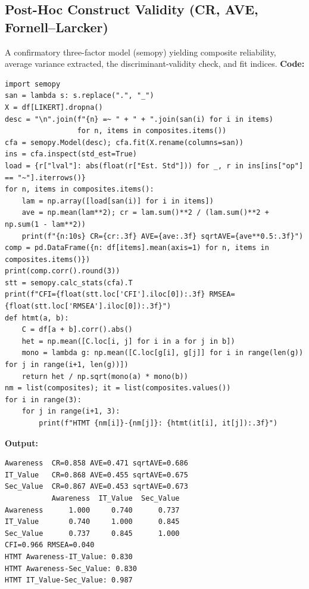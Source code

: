 \subsection{Post-Hoc Construct Validity (CR, AVE, Fornell--Larcker)}
A confirmatory three-factor model (semopy) yielding composite reliability, average variance extracted, the discriminant-validity check, and fit indices.
\noindent\textbf{Code:}\nopagebreak
{\tiny\begin{verbatim}
import semopy
san = lambda s: s.replace(".", "_")
X = df[LIKERT].dropna()
desc = "\n".join(f"{n} =~ " + " + ".join(san(i) for i in items)
                 for n, items in composites.items())
cfa = semopy.Model(desc); cfa.fit(X.rename(columns=san))
ins = cfa.inspect(std_est=True)
load = {r["lval"]: abs(float(r["Est. Std"])) for _, r in ins[ins["op"] == "~"].iterrows()}
for n, items in composites.items():
    lam = np.array([load[san(i)] for i in items])
    ave = np.mean(lam**2); cr = lam.sum()**2 / (lam.sum()**2 + np.sum(1 - lam**2))
    print(f"{n:10s} CR={cr:.3f} AVE={ave:.3f} sqrtAVE={ave**0.5:.3f}")
comp = pd.DataFrame({n: df[items].mean(axis=1) for n, items in composites.items()})
print(comp.corr().round(3))
stt = semopy.calc_stats(cfa).T
print(f"CFI={float(stt.loc['CFI'].iloc[0]):.3f} RMSEA={float(stt.loc['RMSEA'].iloc[0]):.3f}")
def htmt(a, b):
    C = df[a + b].corr().abs()
    het = np.mean([C.loc[i, j] for i in a for j in b])
    mono = lambda g: np.mean([C.loc[g[i], g[j]] for i in range(len(g)) for j in range(i+1, len(g))])
    return het / np.sqrt(mono(a) * mono(b))
nm = list(composites); it = list(composites.values())
for i in range(3):
    for j in range(i+1, 3):
        print(f"HTMT {nm[i]}-{nm[j]}: {htmt(it[i], it[j]):.3f}")
\end{verbatim}}
\noindent\textbf{Output:}\nopagebreak
{\scriptsize\begin{verbatim}
Awareness  CR=0.858 AVE=0.471 sqrtAVE=0.686
IT_Value   CR=0.868 AVE=0.455 sqrtAVE=0.675
Sec_Value  CR=0.867 AVE=0.453 sqrtAVE=0.673
           Awareness  IT_Value  Sec_Value
Awareness      1.000     0.740      0.737
IT_Value       0.740     1.000      0.845
Sec_Value      0.737     0.845      1.000
CFI=0.966 RMSEA=0.040
HTMT Awareness-IT_Value: 0.830
HTMT Awareness-Sec_Value: 0.830
HTMT IT_Value-Sec_Value: 0.987
\end{verbatim}}

